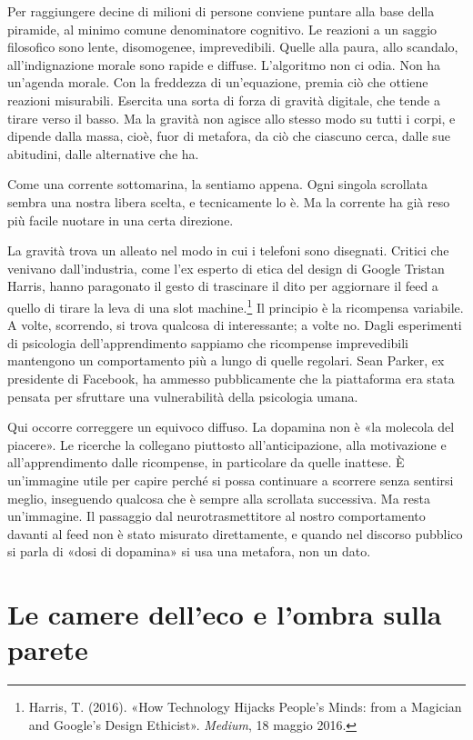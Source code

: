 Per raggiungere decine di milioni di persone conviene puntare alla base della piramide, al minimo comune denominatore cognitivo. Le reazioni a un saggio filosofico sono lente, disomogenee, imprevedibili. Quelle alla paura, allo scandalo, all'indignazione morale sono rapide e diffuse. L'algoritmo non ci odia. Non ha un'agenda morale. Con la freddezza di un'equazione, premia ciò che ottiene reazioni misurabili. Esercita una sorta di forza di gravità digitale, che tende a tirare verso il basso. Ma la gravità non agisce allo stesso modo su tutti i corpi, e dipende dalla massa, cioè, fuor di metafora, da ciò che ciascuno cerca, dalle sue abitudini, dalle alternative che ha.

Come una corrente sottomarina, la sentiamo appena. Ogni singola scrollata sembra una nostra libera scelta, e tecnicamente lo è. Ma la corrente ha già reso più facile nuotare in una certa direzione.

\label{sec:p2c11-dopamina}
La gravità trova un alleato nel modo in cui i telefoni sono disegnati. Critici che venivano dall'industria, come l'ex esperto di etica del design di Google Tristan Harris, hanno paragonato il gesto di trascinare il dito per aggiornare il feed a quello di tirare la leva di una slot machine.\footnote{Harris, T. (2016). «How Technology Hijacks People's Minds: from a Magician and Google's Design Ethicist». \textit{Medium}, 18 maggio 2016.} Il principio è la ricompensa variabile. A volte, scorrendo, si trova qualcosa di interessante; a volte no. Dagli esperimenti di psicologia dell'apprendimento sappiamo che ricompense imprevedibili mantengono un comportamento più a lungo di quelle regolari. Sean Parker, ex presidente di Facebook, ha ammesso pubblicamente che la piattaforma era stata pensata per sfruttare una vulnerabilità della psicologia umana.

Qui occorre correggere un equivoco diffuso. La dopamina non è «la molecola del piacere». Le ricerche la collegano piuttosto all'anticipazione, alla motivazione e all'apprendimento dalle ricompense, in particolare da quelle inattese. È un'immagine utile per capire perché si possa continuare a scorrere senza sentirsi meglio, inseguendo qualcosa che è sempre alla scrollata successiva. Ma resta un'immagine. Il passaggio dal neurotrasmettitore al nostro comportamento davanti al feed non è stato misurato direttamente, e quando nel discorso pubblico si parla di «dosi di dopamina» si usa una metafora, non un dato.

\section{Le camere dell'eco e l'ombra sulla parete}
\label{sec:p2c11-camere-eco}

